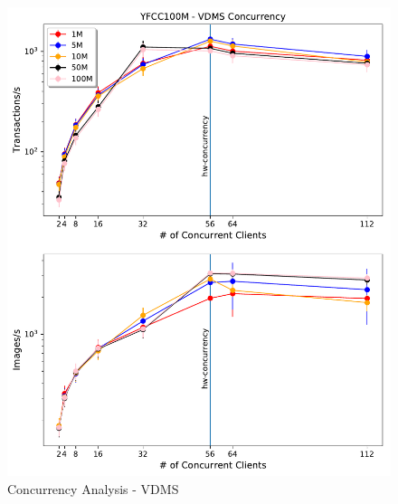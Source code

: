 \begin{figure}[]
\centering
\includegraphics[width=\columnwidth]{figures/concurrency_vdms}
\caption{Concurrency Analysis - VDMS}
\label{fig:concurrency_vdms}
\end{figure}

